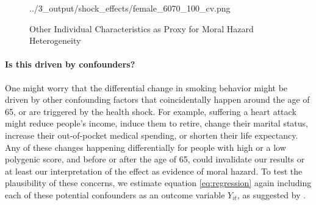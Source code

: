 \documentclass[11pt]{article}
\begin{document}
\begin{figure}[ht]
\begin{center}
{		{../3_output/shock_effects/female_6070_100_cv.png}
		}
		\caption{Other Individual Characteristics as Proxy for Moral Hazard Heterogeneity
					\label{fig:otherX}}
	\vspace{-5ex}
	\end{center}
\end{figure}


\paragraph{Is this driven by confounders?}
One might worry that the differential change in smoking behavior might be driven by other confounding factors that coincidentally happen around the age of 65, or are triggered by the health shock.
For example, suffering a heart attack might reduce people's income, induce them to retire, change their marital status, increase their out-of-pocket medical spending, or shorten their life expectancy.
Any of these changes happening differentially for people with high or a low polygenic score, and before or after the age of 65, could invalidate our results or at least our interpretation of the effect as evidence of moral hazard.
To test the plausibility of these concerns, we estimate equation \ref{eq:regression} again including each of these potential confounders as an outcome variable $Y_{it}$, as suggested by \cite{Pei2018}.
\end{document}
